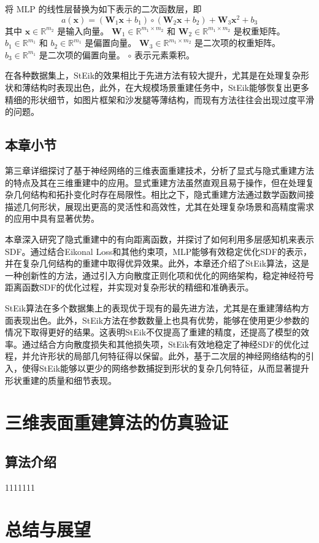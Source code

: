 \documentclass{xduugthesis}
\begin{document}
将 MLP 的线性层替换为如下表示的二次函数层，即
\begin{equation}
a(\mathbf{x}) = (\mathbf{W}_1 \mathbf{x} + b_1) \circ (\mathbf{W}_2 \mathbf{x} + b_2) + \mathbf{W}_3 \mathbf{x}^2 + b_3
\end{equation}
其中
\( \mathbf{x} \in \mathbb{R}^{m_2} \) 是输入向量。
\( \mathbf{W}_1 \in \mathbb{R}^{m_1 \times m_2} \) 和 \( \mathbf{W}_2 \in \mathbb{R}^{m_1 \times m_2} \) 是权重矩阵。
\( b_1 \in \mathbb{R}^{m_1} \) 和 \( b_2 \in \mathbb{R}^{m_1} \) 是偏置向量。
\( \mathbf{W}_3 \in \mathbb{R}^{m_1 \times m_2} \) 是二次项的权重矩阵。
\( b_3 \in \mathbb{R}^{m_1} \) 是二次项的偏置向量。
\( \circ \) 表示元素乘积。

在各种数据集上，StEik的效果相比于先进方法有较大提升，尤其是在处理复杂形状和薄结构时表现出色，此外，在大规模场景重建任务中，StEik能够恢复出更多精细的形状细节，如图片框架和沙发腿等薄结构，而现有方法往往会出现过度平滑的问题。
\section{本章小节}
第三章详细探讨了基于神经网络的三维表面重建技术，分析了显式与隐式重建方法的特点及其在三维重建中的应用。显式重建方法虽然直观且易于操作，但在处理复杂几何结构和拓扑变化时存在局限性。相比之下，隐式重建方法通过数学函数间接描述几何形状，展现出更高的灵活性和高效性，尤其在处理复杂场景和高精度需求的应用中具有显著优势。

本章深入研究了隐式重建中的有向距离函数，并探讨了如何利用多层感知机来表示SDF。通过结合Eikonal Loss和其他约束项，MLP能够有效稳定优化SDF的表示，并在复杂几何结构的重建中取得优异效果。此外，本章还介绍了StEik算法，这是一种创新性的方法，通过引入方向散度正则化项和优化的网络架构，稳定神经符号距离函数SDF的优化过程，并实现对复杂形状的精细和准确表示。

StEik算法在多个数据集上的表现优于现有的最先进方法，尤其是在重建薄结构方面表现出色。此外，StEik方法在参数数量上也具有优势，能够在使用更少参数的情况下取得更好的结果。这表明StEik不仅提高了重建的精度，还提高了模型的效率。通过结合方向散度损失和其他损失项，StEik有效地稳定了神经SDF的优化过程，并允许形状的局部几何特征得以保留。此外，基于二次层的神经网络结构的引入，使得StEik能够以更少的网络参数捕捉到形状的复杂几何特征，从而显著提升形状重建的质量和细节表现。
\chapter{三维表面重建算法的仿真验证}
\section{算法介绍}
1111111
\chapter{总结与展望}
\end{document}
